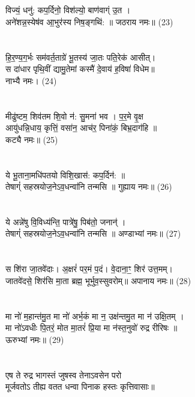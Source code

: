 {\small{}}\\
\\
विज्यं॒ धनु॑: कप॒र्दिनो॒ विश॑ल्यो॒ बाण॑वाग्ं उ॒त ।\\
अने॑शन्न॒स्येष॑व आ॒भुर॑स्य निष॒ङ्गथि॑: ॥ जठराय नमः॥ (23)\\
{\small{}}\\
\\
हि॒र॒ण्य॒ग॒र्भः सम॑वर्त॒ताग्रे॑ भू॒तस्य॑ जा॒तः पति॒रेक॑ आसीत्।\\
स दा॑धार पृथि॒वीं द्यामु॒तेमां कस्मै॑ दे॒वाय॑ ह॒विषा॑ विधेम॥ \\
नाभ्यै नमः। (24)	\\
{\small{}}\\
\\
मीढु॑ष्टम॒ शिव॑तम शि॒वो न॑: सु॒मना॑ भव । प॒र॒मे वृ॒क्ष \\
आयु॑धन्नि॒धाय॒ कृत्तिं॒ वसा॑न॒ आच॑र॒ पिना॑कं॒ बिभ्र॒दाग॑हि ॥ \\
कट्यै नमः॥ (25)\\
{\small{}}\\
    \\
ये भू॒ताना॒मधि॑पतयो विशि॒खास॑: कप॒र्दिन॑: ॥\\
तेषाग्ं॑ सहस्रयोज॒नेऽव॒धन्वा॑नि तन्मसि ॥ गुह्याय नमः॥ (26)\\
{\small{}}\\
\\
ये अन्ने॑षु वि॒विध्य॑न्ति॒ पात्रे॑षु॒ पिब॑तो॒ जनान्॑ ।\\
तेषाग्ं॑ सहस्रयोज॒नेऽव॒धन्वा॑नि तन्मसि ॥ अण्डाभ्यां नमः॥ (27)\\
{\small{}}\\
\\
स शि॑रा जा॒तवे॑दाः। अ॒क्षरं॑ पर॒मं प॒दं। वे॒दाना॒ꣳ॒ शिर॑ उत्त॒मम्।\\
जातवे॑दसे॒ शिर॑सि मा॒ता ब्रह्म॒ भूर्भुव॒स्सुवरोम्‌॥ अपानाय नमः॥ (28)\\
{\small{}}\\
\\
मा नो॑ म॒हान्त॑मु॒त मा नो॑ अर्भ॒कं मा न॒ उक्ष॑न्तमु॒त मा न॑ उक्षि॒तम् ।\\
मा नो॑ऽवधीः पि॒तरं॒ मोत मा॒तरं॑ प्रि॒या मा न॑स्त॒नुवो॑ रुद्र रीरिषः ॥\\
ऊरुभ्यां नमः॥ (29)\\
{\small{}}\\
\\
एष ते रुद्र भागस्तं जुषस्व तेनाऽवसेन परो \\
मूर्जवतोऽ तीह्य वतत धन्वा पिनाक हस्तः कृत्तिवासाः॥ \\
